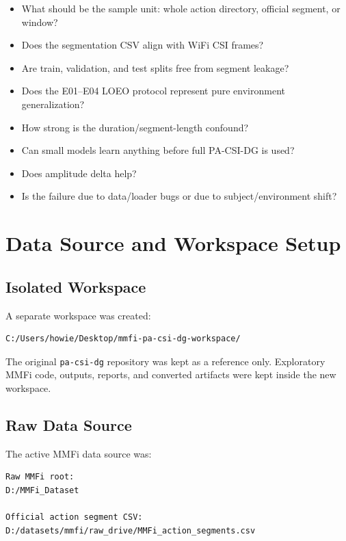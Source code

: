 \documentclass[11pt]{article}
\begin{document}
\begin{itemize}
  \item What should be the sample unit: whole action directory, official segment, or window?
  \item Does the segmentation CSV align with WiFi CSI frames?
  \item Are train, validation, and test splits free from segment leakage?
  \item Does the E01--E04 LOEO protocol represent pure environment generalization?
  \item How strong is the duration/segment-length confound?
  \item Can small models learn anything before full PA-CSI-DG is used?
  \item Does amplitude delta help?
  \item Is the failure due to data/loader bugs or due to subject/environment shift?
\end{itemize}

\section{Data Source and Workspace Setup}

\subsection{Isolated Workspace}

A separate workspace was created:

\begin{verbatim}
C:/Users/howie/Desktop/mmfi-pa-csi-dg-workspace/
\end{verbatim}

The original \texttt{pa-csi-dg} repository was kept as a reference only. Exploratory MMFi code, outputs, reports, and converted artifacts were kept inside the new workspace.

\subsection{Raw Data Source}

The active MMFi data source was:

\begin{verbatim}
Raw MMFi root:
D:/MMFi_Dataset

Official action segment CSV:
D:/datasets/mmfi/raw_drive/MMFi_action_segments.csv
\end{verbatim}
\end{document}

